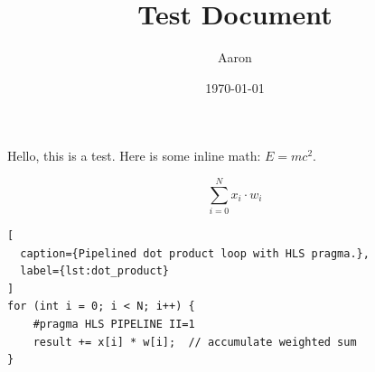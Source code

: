 \documentclass{article}
\begin{document}
\title{Test Document}
\author{Aaron}
\date{\today}
\maketitle

Hello, this is a test. Here is some inline math: $E = mc^2$.

\begin{equation}
  \sum_{i=0}^{N} x_i \cdot w_i
\end{equation}

\begin{lstlisting}[
  caption={Pipelined dot product loop with HLS pragma.},
  label={lst:dot_product}
]
for (int i = 0; i < N; i++) {
    #pragma HLS PIPELINE II=1
    result += x[i] * w[i];  // accumulate weighted sum
}
\end{lstlisting}
\end{document}
